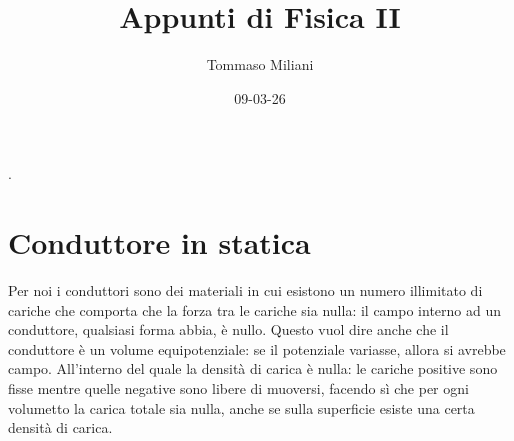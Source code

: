 \documentclass[a4paper, oneside]{article}
\title{Appunti di Fisica II}
\author{Tommaso Miliani}
\date{09-03-26}
\begin{document}
                {}          %
                {}          %
                {\slshape}  %
                {}          %
                {\bfseries} %
                {.}         %
                {\newline}  %
                {}          %
\theoremstyle{theoremEnv}

\newtheorem{definition}{Definizione}[section]
\newtheorem{theorem}{Teorema}[section]
\newtheorem{lemma}{Proposizione}[section]
\newtheorem{observation}{Osservazione}[section]
\newtheorem{corollary}{Corollario}[theorem]
\newtheorem{example}{Esempio}[section]
\newtheorem{remark}{Enunciato}[section]

\maketitle

\section{Conduttore in statica}
Per noi i conduttori sono dei materiali in cui esistono un numero illimitato
di cariche che comporta che la forza tra le cariche sia nulla: il campo interno ad un conduttore,
qualsiasi forma abbia, è nullo. Questo vuol dire anche che il conduttore è un 
volume equipotenziale: se il potenziale variasse, allora si avrebbe campo. All'interno 
del quale la densità di carica è nulla: le cariche positive sono fisse mentre quelle 
negative sono libere di muoversi, facendo sì che per ogni volumetto 
la carica totale sia nulla, anche se sulla superficie esiste una certa densità di carica.
\end{document}
